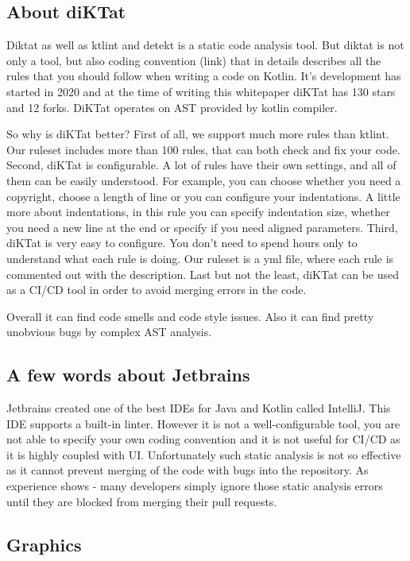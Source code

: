 \subsection{About diKTat}
\par Diktat as well as ktlint and detekt is a static code analysis tool. But diktat is not only a tool, but also coding convention (link) that in details describes all the rules that you should follow when writing a code on Kotlin. It's development has started in 2020 and at the time of writing this whitepaper diKTat has 130 stars and 12 forks. DiKTat operates on AST provided by kotlin compiler. 
\par So why is diKTat better? First of all, we support much more rules than ktlint. Our ruleset includes more than 100 rules, that can both check and fix your code. Second, diKTat is configurable. A lot of rules have their own settings, and all of them can be easily understood. For example, you can choose whether you need a copyright, choose a length of line or you can configure your indentations. A little more about indentations, in this rule you can specify indentation size, whether you need a new line at the end or specify if you need aligned parameters. Third, diKTat is very easy to configure. You don't need to spend hours only to understand what each rule is doing. Our ruleset is a yml file, where each rule is commented out with the description. Last but not the least, diKTat can be used as a CI/CD tool in order to avoid merging errors in the code.
\par Overall it can find code smells and code style issues. Also it can find pretty unobvious bugs by complex AST analysis.

\subsection{A few words about Jetbrains}
\par Jetbrains created one of the best IDEs for Java and Kotlin called IntelliJ. This IDE supports a built-in linter. However it is not a well-configurable tool, you are not able to specify your own coding convention and it is not useful for CI/CD as it is highly coupled with UI. Unfortunately such static analysis is not so effective as it cannot prevent merging of the code with bugs into the repository. As experience shows - many developers simply ignore those static analysis errors until they are blocked from merging their pull requests.

\subsection{Graphics}
